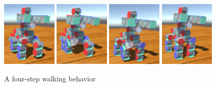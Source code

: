 \documentclass[graybox]{svmult}
\begin{document}
\begin{figure}
\begin{center}
                \includegraphics[width=0.23\textwidth]{images/library/unity/step1.png}
                \includegraphics[width=0.23\textwidth]{images/library/unity/step2.png}
                \includegraphics[width=0.23\textwidth]{images/library/unity/step3.png}
                \includegraphics[width=0.23\textwidth]{images/library/unity/step4.png}
\end{center}
\caption{A four-step walking behavior}
\label{fig:walk}
\end{figure}
\end{document}
